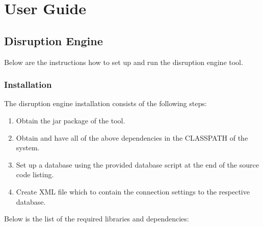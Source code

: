 \chapter{User Guide}

\section{Disruption Engine}
Below are the instructions how to set up and run the disruption engine tool.

\subsection{Installation}
The disruption engine installation consists of the following steps:
\begin{enumerate}
	\item Obtain the jar package of the tool.
	\item Obtain and have all of the above dependencies in the CLASSPATH of the system.
	\item Set up a database using the provided database script at the end of the source code listing.
	\item Create XML file which to contain the connection settings to the respective database.
\end{enumerate}
Below is the list of the required libraries and dependencies:

